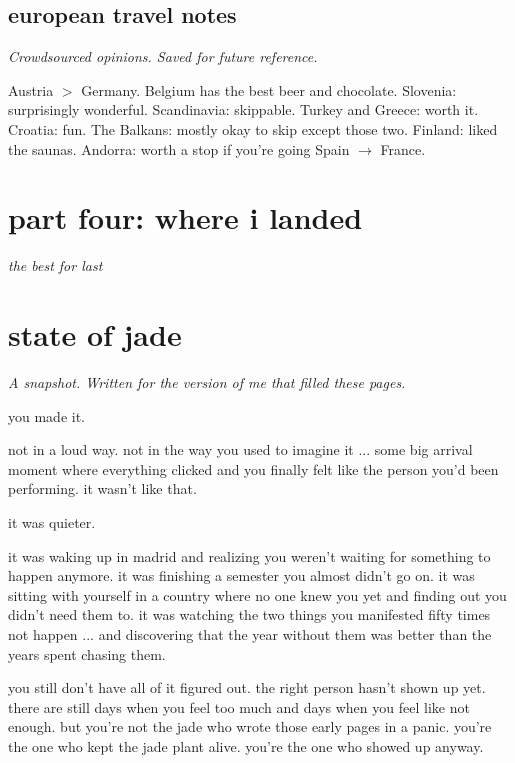 \documentclass[12pt, letterpaper]{article}
\begin{document}
\subsection{european travel notes}

\textit{Crowdsourced opinions. Saved for future reference.}

Austria $>$ Germany. Belgium has the best beer and chocolate. Slovenia: surprisingly wonderful. Scandinavia: skippable. Turkey and Greece: worth it. Croatia: fun. The Balkans: mostly okay to skip except those two. Finland: liked the saunas. Andorra: worth a stop if you're going Spain $\to$ France.

\newpage
\section*{\color{matcha} part four: where i landed}
\vspace{-0.5em}
{\small\color{gray}\itshape the best for last}
\vspace{1em}

\section{state of jade}

\textit{A snapshot. Written for the version of me that filled these pages.}

\medskip

you made it.

not in a loud way. not in the way you used to imagine it ... some big arrival moment where everything clicked and you finally felt like the person you'd been performing. it wasn't like that.

it was quieter.

it was waking up in madrid and realizing you weren't waiting for something to happen anymore. it was finishing a semester you almost didn't go on. it was sitting with yourself in a country where no one knew you yet and finding out you didn't need them to. it was watching the two things you manifested fifty times not happen ... and discovering that the year without them was better than the years spent chasing them.

you still don't have all of it figured out. the right person hasn't shown up yet. there are still days when you feel too much and days when you feel like not enough. but you're not the jade who wrote those early pages in a panic. you're the one who kept the jade plant alive. you're the one who showed up anyway.
\end{document}
